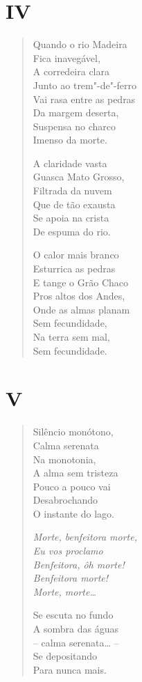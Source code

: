 \pagebreak
\section*{IV}

\begin{verse}
Quando o rio Madeira\\
Fica inavegável,\\
A corredeira clara\\
Junto ao trem"-de"-ferro\\
Vai rasa entre as pedras\\
Da margem deserta,\\
Suspensa no charco\\
Imenso da morte.

A claridade vasta\\
Guasca Mato Grosso,\\
Filtrada da nuvem\\
Que de tão exausta\\
Se apoia na crista\\
De espuma do rio.

O calor mais branco\\
Esturrica as pedras\\
E tange o Grão Chaco\\
Pros altos dos Andes,\\
Onde as almas planam\\
Sem fecundidade,\\
Na terra sem mal,\\
Sem fecundidade.
\end{verse}

\pagebreak
\section*{V}

\begin{verse}
Silêncio monótono,\\
Calma serenata\\
Na monotonia,\\
A alma sem tristeza\\
Pouco a pouco vai\\
Desabrochando\\
O instante do lago.

\qquad\emph{Morte, benfeitora morte,}\\
\qquad\emph{Eu vos proclamo }\\
\qquad\emph{Benfeitora, ôh morte! }\\
\qquad\emph{Benfeitora morte! }\\
\qquad\emph{Morte, morte\ldots{}}

Se escuta no fundo\\
A sombra das águas\\
-- calma serenata\ldots{} --\\
Se depositando\\
Para nunca mais.
\end{verse}

